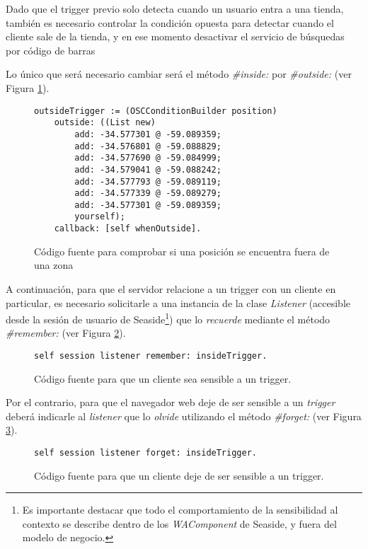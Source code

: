 Dado que el trigger previo solo detecta cuando un usuario entra a una tienda, también es necesario controlar la condición opuesta para detectar cuando el cliente sale de la tienda, y en ese momento desactivar el servicio de búsquedas por código de barras

Lo único que será necesario cambiar será el método \emph{\#inside:} por \emph{\#outside:} (ver Figura \ref{PositionOutsideZoneExample}).

\begin{figure}[ht!]
\begin{Verbatim}
outsideTrigger := (OSCConditionBuilder position)
	outside: ((List new)
		add: -34.577301 @ -59.089359;
		add: -34.576801 @ -59.088829;
		add: -34.577690 @ -59.084999;
		add: -34.579041 @ -59.088242;
		add: -34.577793 @ -59.089119;
		add: -34.577339 @ -59.089279;
		add: -34.577301 @ -59.089359;
		yourself);
	callback: [self whenOutside].
\end{Verbatim}
\caption{Código fuente para comprobar si una posición se encuentra fuera de una zona}
\label{PositionOutsideZoneExample}
\end{figure}

A continuación, para que el servidor relacione a un trigger con un cliente en particular, es necesario solicitarle a una instancia de la clase \emph{Listener} (accesible desde la sesión de usuario de Seaside\footnote{Es importante destacar que todo el comportamiento de la sensibilidad al contexto se describe dentro de los \emph{WAComponent} de Seaside, y fuera del modelo de negocio.}) que lo \emph{recuerde} mediante el método \emph{\#remember:} (ver Figura \ref{PositionRememberListeningExample}).

\begin{figure}[ht!]
\begin{Verbatim}
self session listener remember: insideTrigger.
\end{Verbatim}
\caption{Código fuente para que un cliente sea sensible a un trigger.}
\label{PositionRememberListeningExample}
\end{figure}

Por el contrario, para que el navegador web deje de ser sensible a un \emph{trigger} deberá indicarle al \emph{listener} que lo \emph{olvide} utilizando el método \emph{\#forget:} (ver Figura \ref{PositionForgetListeningExample}).

\begin{figure}[ht!]
\begin{Verbatim}
self session listener forget: insideTrigger.
\end{Verbatim}
\caption{Código fuente para que un cliente deje de ser sensible a un trigger.}
\label{PositionForgetListeningExample}
\end{figure}

